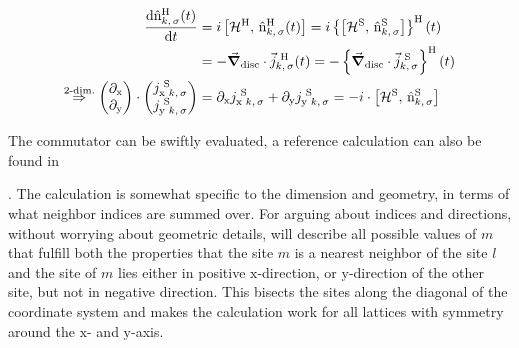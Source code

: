 \begin{equation}
    \label{eq:continuity-equation}
    \begin{split}
        \difft{\nopOfT[\heisenbergPicture]{k}{\sigma}} &= 
        i \left[\pictureHamiltonian[\heisenbergPicture],\, \nopOfT[\heisenbergPicture]{k}{\sigma}\right] = 
        i \heisenbergTimeEvolution{
            \left[\pictureHamiltonian[\schroedingerPicture],\, \nop[\schroedingerPicture]{k}{\sigma}\right]
        }\\ 
        &= - \discreteGradient \cdot \currentvecOft[\heisenbergPicture]{k}{\sigma}
         = - \heisenbergTimeEvolution{\discreteGradient \cdot \currentvec[\schroedingerPicture]{k}{\sigma} } \\
        \stackrel{\text{2-dim.}}{\Rightarrow}
        \left(\begin{matrix}
            \partial_\text{x}\\
            \partial_\text{y}\\
        \end{matrix}\right) \cdot 
        \left(\begin{matrix}
            j_{\text{x}\,\,k,\,\sigma}^{\,\,\schroedingerPicture}\\
            j_{\text{y}\,\,k,\,\sigma}^{\,\,\schroedingerPicture}
        \end{matrix}\right) &=
        \partial_\text{x}
        j_{\text{x}\,\,k,\,\sigma}^{\,\,\schroedingerPicture}+
        \partial_\text{y} 
        j_{\text{y}\,\,k,\,\sigma}^{\,\,\schroedingerPicture}
         = - i \cdot \left[\pictureHamiltonian[\schroedingerPicture],\, \nop[\schroedingerPicture]{k}{\sigma}\right]
    \end{split}
\end{equation}

The commutator can be swiftly evaluated, a reference calculation can also be found in 

. The calculation is somewhat specific to the dimension and geometry, in terms of what neighbor indices are summed over.
For arguing about indices and directions, without worrying about geometric details,  will describe all possible values of $m$ that fulfill both the properties that the site $m$ is a nearest neighbor of the site $l$ and the site of $m$ lies either in positive $\text{x}$-direction, or $\text{y}$-direction of the other site, but not in negative direction.
This bisects the sites along the diagonal of the coordinate system and makes the calculation work for all lattices with symmetry around the $\text{x}$- and $\text{y}$-axis.


